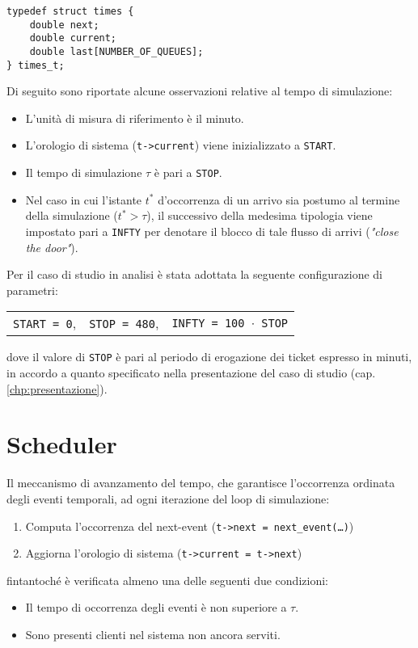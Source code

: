 \begin{lstlisting}[label={lst:modello-computazionale-1}, caption={Struttura dati per la gestione del tempo}]
typedef struct times {
    double next;                 	                                         
    double current;                	
    double last[NUMBER_OF_QUEUES];  
} times_t;
\end{lstlisting}

Di seguito sono riportate alcune osservazioni relative al tempo di simulazione:
\begin{itemize}
\item L'unità di misura di riferimento è il minuto.
\item L'orologio di sistema (\texttt{t->current}) viene inizializzato a \texttt{START}.
\item Il tempo di simulazione $\tau$ è pari a \texttt{STOP}.
\item Nel caso in cui l'istante $t^*$ d'occorrenza di un arrivo sia postumo al termine della simulazione ($t^* > \tau$), il successivo della medesima tipologia viene impostato pari a \texttt{INFTY} per denotare il blocco di tale flusso di arrivi (\textit{"close the door"}).
\end{itemize}
Per il caso di studio in analisi è stata adottata la seguente configurazione di parametri:
\begin{center}
\begin{tabular}{l c r}
\texttt{START = 0}, & \texttt{STOP = 480}, & \texttt{INFTY = 100 $\cdot$ STOP}
\end{tabular}
\end{center}
dove il valore di \texttt{STOP} è pari al periodo di erogazione dei ticket espresso in minuti, in accordo a quanto specificato nella presentazione del caso di studio (cap. \ref{chp:presentazione}).
\section{Scheduler}\label{sec:modello-computazionale-scheduler}
Il meccanismo di avanzamento del tempo, che garantisce l'occorrenza ordinata degli eventi temporali, ad ogni iterazione del loop di simulazione:
\begin{enumerate}
\item Computa l'occorrenza del next-event (\texttt{t->next = next\_event(\dots)})
\item Aggiorna l'orologio di sistema (\texttt{t->current = t->next})
\end{enumerate}
fintantoché è verificata almeno una delle seguenti due condizioni:
\begin{itemize}
\item Il tempo di occorrenza degli eventi è non superiore a $\tau$.
\item Sono presenti clienti nel sistema non ancora serviti.
\end{itemize}

